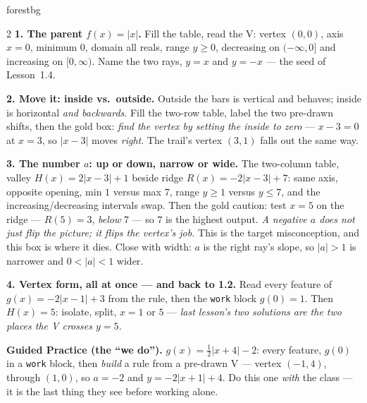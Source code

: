 \documentclass[10pt]{article}
\begin{document}
\begin{skillbox}{forestbg}
\begin{multicols}{2}
\textbf{1. The parent $f(x)=|x|$.} Fill the table, read the V: vertex $(0,0)$, axis $x=0$,
minimum $0$, domain all reals, range $y\ge0$, decreasing on $(-\infty,0]$ and increasing on
$[0,\infty)$. Name the two rays, $y=x$ and $y=-x$ --- the seed of Lesson~1.4.

\textbf{2. Move it: inside vs.\ outside.} Outside the bars is vertical and behaves; inside is
horizontal \emph{and backwards}. Fill the two-row table, label the two pre-drawn shifts, then the
gold box: \emph{find the vertex by setting the inside to zero} --- $x-3=0$ at $x=3$, so $|x-3|$
moves \emph{right}. The trail's vertex $(3,1)$ falls out the same way.

\columnbreak
\textbf{3. The number $a$: up or down, narrow or wide.} The two-column table, valley
$H(x)=2|x-3|+1$ beside ridge $R(x)=-2|x-3|+7$: same axis, opposite opening, min $1$ versus max $7$,
range $y\ge1$ versus $y\le7$, and the increasing/decreasing intervals swap. Then the gold caution:
test $x=5$ on the ridge --- $R(5)=3$, \emph{below} $7$ --- so $7$ is the highest output. \emph{A
negative $a$ does not just flip the picture; it flips the vertex's job.} This is the target
misconception, and this box is where it dies. Close with width: $a$ is the right ray's slope,
so $|a|>1$ is narrower and $0<|a|<1$ wider.

\textbf{4. Vertex form, all at once --- and back to 1.2.} Read every feature of $g(x)=-2|x-1|+3$
from the rule, then the \texttt{work} block $g(0)=1$. Then $H(x)=5$: isolate, split, $x=1$ or $5$
--- \emph{last lesson's two solutions are the two places the V crosses $y=5$.}

\textbf{Guided Practice (the ``we do'').} $g(x)=\tfrac12|x+4|-2$: every feature, $g(0)$ in a
\texttt{work} block, then \emph{build} a rule from a pre-drawn V --- vertex $(-1,4)$, through
$(1,0)$, so $a=-2$ and $y=-2|x+1|+4$. Do this one \emph{with} the class --- it is the last thing
they see before working alone.
\end{multicols}
\end{skillbox}
\end{document}
